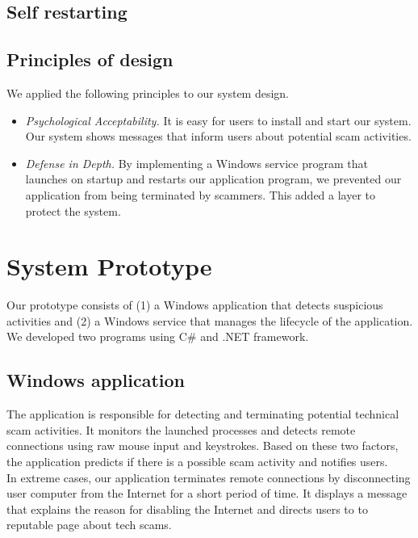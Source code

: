 \documentclass[final]{IEEEtran}
\begin{document}
\subsection{Self restarting}

\subsection{Principles of design}
We applied the following principles to our system design.
\begin{itemize}
  \item\textit{Psychological Acceptability.} It is easy for users to install and start our system. Our system shows messages that inform users about potential scam activities. 
  \item\textit{Defense in Depth.} By implementing a Windows service program that launches on startup and restarts our application program, we prevented our application from being terminated by scammers. This added a layer to protect the system. 
\end{itemize}

\section{System Prototype} %
Our prototype consists of (1) a Windows application that detects suspicious activities and (2) a Windows service that manages the lifecycle of the application. We developed two programs using C\# and .NET framework. 

\subsection{Windows application}
The application is responsible for detecting and terminating potential technical scam activities. It monitors the launched processes and detects remote connections using raw mouse input and keystrokes. Based on these two factors, the application predicts if there is a possible scam activity and notifies users.\\
In extreme cases, our application terminates remote connections by disconnecting user computer from the Internet for a short period of time. It displays a message that explains the reason for disabling the Internet and directs users to to reputable page about tech scams.
\end{document}

